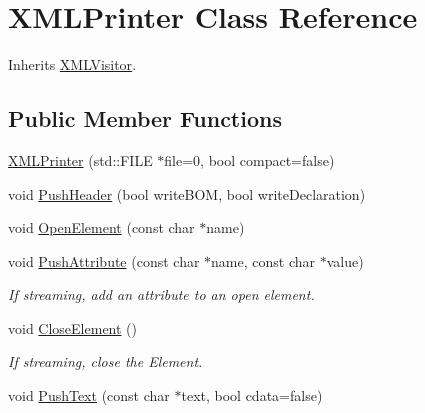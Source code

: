 \hypertarget{classtinyxml2_1_1_x_m_l_printer}{\section{X\-M\-L\-Printer Class Reference}
\label{classtinyxml2_1_1_x_m_l_printer}
}


Inherits \hyperlink{classtinyxml2_1_1_x_m_l_visitor}{X\-M\-L\-Visitor}.

\subsection*{Public Member Functions}
\begin{DoxyCompactItemize}
\item 
\hyperlink{classtinyxml2_1_1_x_m_l_printer_a77c1ebc3fdf07366fbf469aa5f1c29c9}{X\-M\-L\-Printer} (std\-::\-F\-I\-L\-E $\ast$file=0, bool compact=false)
\item 
void \hyperlink{classtinyxml2_1_1_x_m_l_printer_a050a49e22a5a6aa7b9a496d5ba5fbaaa}{Push\-Header} (bool write\-B\-O\-M, bool write\-Declaration)
\item 
void \hyperlink{classtinyxml2_1_1_x_m_l_printer_a4fd1b803ae57b4993d9dd5977be569b5}{Open\-Element} (const char $\ast$name)
\item 
\hypertarget{classtinyxml2_1_1_x_m_l_printer_a98073ed372b5272b2d22e3862ac1c330}{void \hyperlink{classtinyxml2_1_1_x_m_l_printer_a98073ed372b5272b2d22e3862ac1c330}{Push\-Attribute} (const char $\ast$name, const char $\ast$value)}\label{classtinyxml2_1_1_x_m_l_printer_a98073ed372b5272b2d22e3862ac1c330}

\begin{DoxyCompactList}\small\item\em If streaming, add an attribute to an open element. \end{DoxyCompactList}\item 
\hypertarget{classtinyxml2_1_1_x_m_l_printer_aa8b0812a8e4a35a7f2c1aaa94751f127}{void \hyperlink{classtinyxml2_1_1_x_m_l_printer_aa8b0812a8e4a35a7f2c1aaa94751f127}{Close\-Element} ()}\label{classtinyxml2_1_1_x_m_l_printer_aa8b0812a8e4a35a7f2c1aaa94751f127}

\begin{DoxyCompactList}\small\item\em If streaming, close the Element. \end{DoxyCompactList}\item 
\hypertarget{classtinyxml2_1_1_x_m_l_printer_a461b074400643b9d5020f5041a861846}{void \hyperlink{classtinyxml2_1_1_x_m_l_printer_a461b074400643b9d5020f5041a861846}{Push\-Text} (const char $\ast$text, bool cdata=false)}\label{classtinyxml2_1_1_x_m_l_printer_a461b074400643b9d5020f5041a861846}


\end{DoxyCompactItemize}
